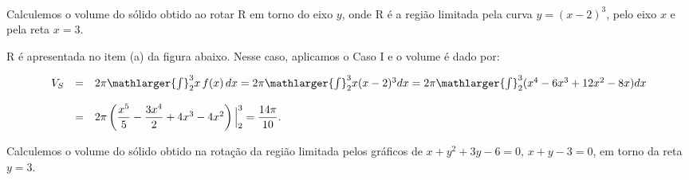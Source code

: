 \cleardoublepage\documentclass[../main.tex]{subfiles}
\begin{document}
\begin{ex}~
\begin{compactenum}[a)]
\item Calculemos o volume do sólido obtido ao rotar R em torno do eixo \(y\), onde R é a região limitada pela curva \(y=(x-2)^3\), pelo eixo \(x\) e pela reta \(x=3\).

\begin{solution}
R é apresentada no item (a) da figura abaixo. Nesse caso, aplicamos o Caso I e o volume é dado por:

\[\begin{array}{rcl} V_S&=& 2\pi \mathlarger{\int}^{3}_{2}x\,f(x)\,dx = 2\pi \mathlarger{\int}^{3}_{2}x(x-2)^3dx= 2\pi \mathlarger{\int}^{3}_{2}(x^4-6x^3+12x^2-8x)dx\\ \\ &=& 2\pi \left(\dfrac{x^5}{5}-\dfrac{3x^4}{2}+4x^3-4x^2\right)\Big{|}^{3}_{2} = \dfrac{14\pi}{10}. \end{array} \]
\end{solution}
\begin{figure}[H]
\centering
{}\hfill
{}\hfill
{}
\end{figure}
\item Calculemos o volume do sólido obtido na rotação da região limitada pelos gráficos de \(x+y^2+3y-6=0\), \(x+y-3=0\), em torno da reta \(y=3\).


\end{compactenum}
\end{ex}
\end{document}
